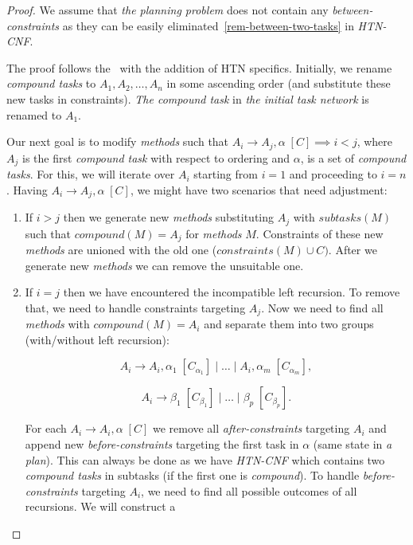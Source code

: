 \begin{proof}
    We assume that \emph{the planning problem} does not contain any \emph{between-constraints} as they can be easily eliminated~\ref{rem-between-two-tasks} in \emph{HTN-CNF}.

    The proof follows the~\cite{gnf_bartak} with the addition of HTN specifics. Initially, we rename \emph{compound tasks} to $A_1, A_2, \dots, A_n$ in some ascending order (and substitute these new tasks in constraints). \emph{The compound task} in \emph{the initial task network} is renamed to $A_1$. 
    
    Our next goal is to modify \emph{methods} such that $A_i \rightarrow A_j, \alpha \; [C] \implies i < j$, where $A_j$ is the first \emph{compound task} with respect to ordering and $\alpha$, is a set of \emph{compound tasks}. For this, we will iterate over $A_i$ starting from $i = 1$ and proceeding to $i = n$. Having $A_i \rightarrow A_j, \alpha \; [C]$, we might have two scenarios that need adjustment:

    \begin{enumerate}
        \item If $i > j$ then we generate new \emph{methods} substituting $A_j$ with $subtasks(M)$ such that $compound(M) = A_j$ for \emph{methods} $M$. Constraints of these new \emph{methods} are unioned with the old one ($constraints(M) \cup C)$. After we generate new \emph{methods} we can remove the unsuitable one.

        \item If $i = j$ then we have encountered the incompatible left recursion. To remove that, we need to handle constraints targeting $A_j$. Now we need to find all \emph{methods} with $compound(M) = A_i$ and separate them into two groups (with/without left recursion):

        \[
            A_i \rightarrow A_i, \alpha_1 \; [C_{\alpha_1}] \; | \; \dots \; | \; A_i, \alpha_m \; [C_{\alpha_m}],
        \]
    
        \[
            A_i \rightarrow \beta_1 \; [C_{\beta_1}] \; | \; \dots \; | \; \beta_p \; [C_{\beta_p}].
        \]

        For each $A_i \rightarrow A_i, \alpha \; [C]$ we remove all \emph{after-constraints} targeting $A_i$ and append new \emph{before-constraints} targeting the first task in $\alpha$ (same state in \emph{a plan}). This can always be done as we have \emph{HTN-CNF} which contains two \emph{compound tasks} in subtasks (if the first one is \emph{compound}). To handle \emph{before-constraints} targeting $A_i$, we need to find all possible outcomes of all recursions. We will construct a 
        

\end{enumerate}
\end{proof}
